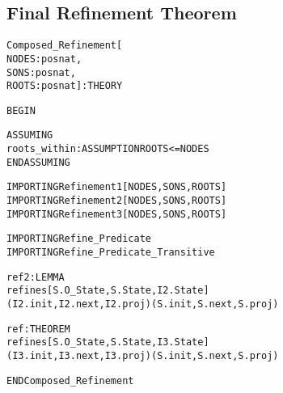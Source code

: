 

\newpage
\subsection{Final Refinement Theorem}

\begin{alltt}
%%%%%%%%%%%%%%%%%%%%%%%%%%%%%%%%%%%%%%%%%%%%%%%%%%%%%%%%%%%%%%%%%%%%
% Composed_Refinement :                                            %
%   States the final correctness criteria in theorem ``ref'',      %
%   which says that the third implementation refines the top-level %
%   specification. The proof uses the transitivity property of the %
%   refinement relation.                                           %
%%%%%%%%%%%%%%%%%%%%%%%%%%%%%%%%%%%%%%%%%%%%%%%%%%%%%%%%%%%%%%%%%%%%
 
Composed_Refinement[
  NODES : posnat,
  SONS  : posnat,
  ROOTS : posnat] : THEORY
 
BEGIN
 
  ASSUMING
    roots_within : ASSUMPTION ROOTS <= NODES
  ENDASSUMING

  IMPORTING Refinement1[NODES,SONS,ROOTS]
  IMPORTING Refinement2[NODES,SONS,ROOTS]
  IMPORTING Refinement3[NODES,SONS,ROOTS]

  IMPORTING Refine_Predicate
  IMPORTING Refine_Predicate_Transitive

  ref2 : LEMMA 
    refines[S.O_State,S.State,I2.State]
      (I2.init,I2.next,I2.proj)(S.init,S.next,S.proj)

  ref : THEOREM 
    refines[S.O_State,S.State,I3.State]
      (I3.init,I3.next,I3.proj)(S.init,S.next,S.proj)

END Composed_Refinement
\end{alltt}

